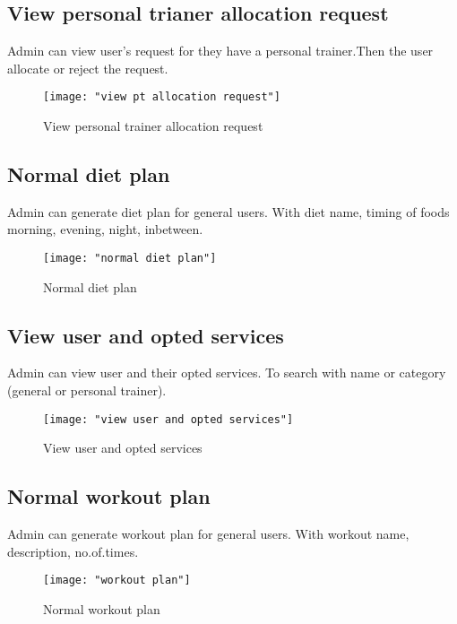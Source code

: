 \documentclass[a4paper,12pt,toc=flat]{report}
\begin{document}
{{	\subsection{View personal trianer allocation request}
	 \hspace*{12pt} Admin can view user's request for they have a personal trainer.Then the user allocate or reject the request.
	\begin{figure}[bph]
		\begin{center}
			\texttt{[image: "view pt allocation request"]}
		\end{center}
		\caption{View personal trainer allocation request}
	\end{figure}
	\pagebreak
	\subsection{Normal diet plan}
	 \hspace*{12pt} Admin can generate diet plan for general users. With diet name, timing of foods morning, evening, night, inbetween. 
	\begin{figure}[bph]
		\begin{center}
			\texttt{[image: "normal diet plan"]}
		\end{center}
		\caption{Normal diet plan}
	\end{figure}
	
	\subsection{View user and opted services}
	 \hspace*{12pt} Admin can view user and their opted services. To search with name or category (general or personal trainer).
	\begin{figure}[bph]
		\begin{center}
			\texttt{[image: "view user and opted services"]}
		\end{center}
		\caption{View user and opted services}
	\end{figure}
	\pagebreak
	\subsection{Normal workout plan}
	 \hspace*{12pt} Admin can generate workout  plan for general users. With workout name, description, no.of.times.
	\begin{figure}[bph]
		\begin{center}
			\texttt{[image: "workout plan"]}
		\end{center}
		\caption{Normal workout plan}
	\end{figure}
	
}}
\end{document}
